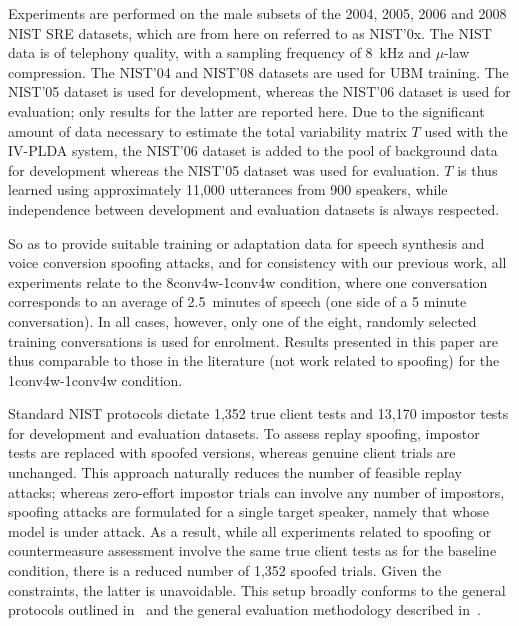 
Experiments are performed on the male subsets of the 2004, 2005, 2006 and 2008 NIST SRE datasets, which are from here on referred to as NIST'0x.  The NIST data is of telephony quality, with a sampling frequency of 8~kHz and $\mu$-law compression.
The NIST'04 and NIST'08 datasets are used for UBM training.
The NIST'05 dataset is used for development, whereas the NIST'06 dataset is used for evaluation;  
only results for the latter are reported here.
Due to the significant amount of data necessary to estimate the total variability matrix $T$ used with the IV-PLDA system, the NIST'06 dataset is added to the pool of background data for development whereas the NIST'05 dataset was used for evaluation. 
$T$ is thus learned using approximately 11,000 utterances from 900 speakers, while independence between development and evaluation datasets is always respected.
 
So as to provide suitable training or adaptation data for speech synthesis and voice conversion spoofing attacks, and for consistency with our previous work, all experiments relate to the 8conv4w-1conv4w condition, where one conversation corresponds to an average of 2.5~minutes of speech (one side of a 5 minute conversation).
In all cases, however, only one of the eight, randomly selected training conversations is used for enrolment. 
Results presented in this paper are thus comparable to those in the literature (not work related to spoofing) for the 1conv4w-1conv4w condition. 

Standard NIST protocols dictate 1,352 true client tests and 13,170 impostor tests for development and evaluation datasets. 
To assess replay spoofing, impostor tests are replaced with spoofed versions, whereas genuine client trials are unchanged.
This approach naturally reduces the number of feasible replay attacks; whereas zero-effort impostor trials can involve any number of impostors, spoofing attacks are formulated for a single target speaker, namely that whose model is under attack.  As a result, while all experiments related to spoofing or countermeasure assessment involve the same true client tests as for the baseline condition, there is a reduced number of 1,352 spoofed trials.  Given the constraints, the latter is unavoidable.  This setup broadly conforms to the general protocols outlined in~\cite{Wu2014a,Wu2015} and the general evaluation methodology described in~\cite{Hadid2015}.


